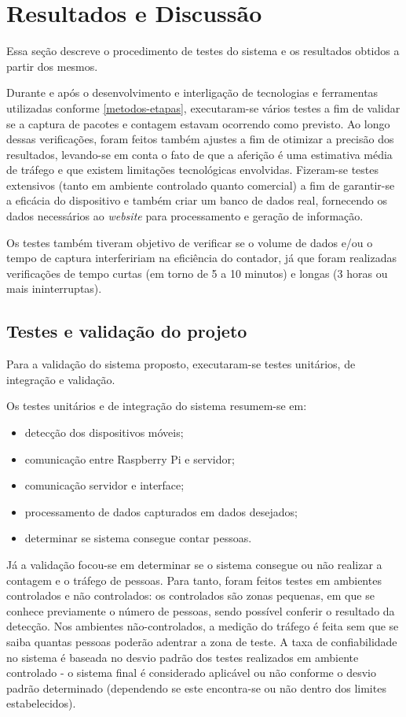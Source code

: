 \chapter{Resultados e Discussão}
\label{resultados-discussao}

Essa seção descreve o procedimento de testes do sistema e os resultados obtidos a partir dos mesmos.

Durante e após o desenvolvimento e interligação de tecnologias e ferramentas utilizadas conforme \autoref{metodos-etapas}, executaram-se vários testes a fim de validar se a captura de pacotes e contagem estavam ocorrendo como previsto. Ao longo dessas verificações, foram feitos também ajustes a fim de otimizar a precisão dos resultados, levando-se em conta o fato de que a aferição é uma estimativa média de tráfego e que existem limitações tecnológicas envolvidas. Fizeram-se testes extensivos (tanto em ambiente controlado quanto comercial) a fim de garantir-se a eficácia do dispositivo e também criar um banco de dados real, fornecendo os dados necessários ao \emph{website} para processamento e geração de informação.

Os testes também tiveram objetivo de verificar se o volume de dados e/ou o tempo de captura interfeririam na eficiência do contador, já que foram realizadas verificações de tempo curtas (em torno de 5 a 10 minutos) e longas (3 horas ou mais ininterruptas). 

\section{Testes e validação do projeto}
Para a validação do sistema proposto, executaram-se testes unitários, de integração e
validação. 

Os testes unitários e de integração do sistema resumem-se em:

\begin{itemize}
  \item detecção dos dispositivos móveis;
  \item comunicação entre Raspberry Pi e servidor;
  \item comunicação servidor e interface;
  \item processamento de dados capturados em dados desejados;
  \item determinar se sistema consegue contar pessoas.
\end{itemize}

Já a validação focou-se em determinar se o sistema consegue ou
não realizar a contagem e o tráfego de pessoas. Para tanto, foram feitos testes em
ambientes controlados e não controlados: os controlados são zonas pequenas, em que se conhece previamente o número de pessoas, sendo possível conferir o resultado da detecção. Nos ambientes não-controlados, a medição do tráfego é feita sem que se saiba quantas pessoas poderão adentrar a zona de teste. A taxa de confiabilidade no sistema é baseada no desvio padrão dos testes realizados em ambiente controlado - o sistema final é considerado aplicável ou não conforme o desvio padrão determinado (dependendo se este encontra-se ou não dentro dos limites estabelecidos).

